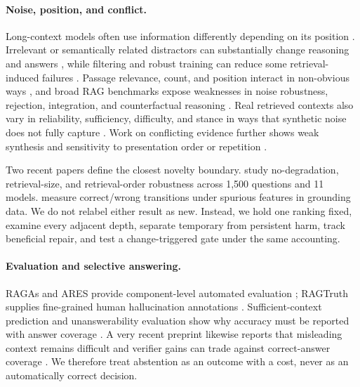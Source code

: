 \documentclass[10pt,twocolumn]{article}
\begin{document}
\paragraph{Noise, position, and conflict.}
Long-context models often use information differently depending on its position \citep{liu2024lost}. Irrelevant or semantically related distractors can substantially change reasoning and answers \citep{shi2023distracted,wu2024irrelevant}, while filtering and robust training can reduce some retrieval-induced failures \citep{yoran2024robust}. Passage relevance, count, and position interact in non-obvious ways \citep{cuconasu2024noise}, and broad RAG benchmarks expose weaknesses in noise robustness, rejection, integration, and counterfactual reasoning \citep{chen2024rgb}. Real retrieved contexts also vary in reliability, sufficiency, difficulty, and stance in ways that synthetic noise does not fully capture \citep{hagstrom2025reality}. Work on conflicting evidence further shows weak synthesis and sensitivity to presentation order or repetition \citep{wang2025conflicting,naphade2026rational}.

Two recent papers define the closest novelty boundary. \citet{cao2025robustness} study no-degradation, retrieval-size, and retrieval-order robustness across 1,500 questions and 11 models. \citet{yang2025spurious} measure correct/wrong transitions under spurious features in grounding data. We do not relabel either result as new. Instead, we hold one ranking fixed, examine every adjacent depth, separate temporary from persistent harm, track beneficial repair, and test a change-triggered gate under the same accounting.

\paragraph{Evaluation and selective answering.}
RAGAs and ARES provide component-level automated evaluation \citep{es2024ragas,saadfalcon2024ares}; RAGTruth supplies fine-grained human hallucination annotations \citep{niu2024ragtruth}. Sufficient-context prediction and unanswerability evaluation show why accuracy must be reported with answer coverage \citep{joren2025sufficient,peng2025unanswerability}. A very recent preprint likewise reports that misleading context remains difficult and verifier gains can trade against correct-answer coverage \citep{setiawan2026abstention}. We therefore treat abstention as an outcome with a cost, never as an automatically correct decision.
\end{document}

